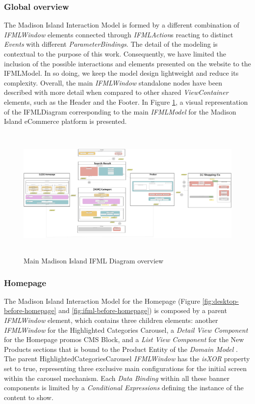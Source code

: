 \subsubsection{Global overview}

The Madison Island Interaction Model is formed by a different combination of \textit{IFMLWindow} elements connected through \textit{IFMLAction}s reacting to distinct \textit{Events} with different \textit{ParameterBindings}. The detail of the modeling is contextual to the purpose of this work. Consequently, we have limited the inclusion of the possible interactions and elements presented on the website to the IFMLModel. In so doing, we keep the model design lightweight and reduce its complexity. Overall, the main \textit{IFMLWindow} standalone nodes have been described with more detail when compared to other shared \textit{ViewContainer} elements, such as the Header and the Footer. In Figure \ref{fig:ifml-before-global}, a visual representation of the IFMLDiagram corresponding to the main \textit{IFMLModel} for the Madison Island eCommerce platform is presented.

\vspace{0.5cm}
\begin{figure}[H]
  \centering
    \includegraphics[height=6.5cm] {images/diagrams/before/ifml-global.png}
  \caption{Main Madison Island IFML Diagram overview}
  \label{fig:ifml-before-global}
\end{figure}
\vspace{0.5cm}
\newpage
\subsubsection{Homepage}

The Madison Island Interaction Model for the Homepage (Figure \ref{fig:desktop-before-homepage} and \ref{fig:ifml-before-homepage}) is composed by a parent \textit{IFMLWindow} element, which contains three children elements: another \textit{IFMLWindow} for the Highlighted Categories Carousel, a \textit{Detail View Component} for the Homepage promos CMS Block, and a \textit{List View Component} for the New Products sections that is bound to the Product Entity of the \textit{Domain Model} . The parent HighlightedCategoriesCarousel \textit{IFMLWindow} has the \textit{isXOR} property set to true, representing three exclusive main configurations for the initial screen within the carousel mechanism. Each \textit{Data Binding} within all these banner components is limited by a \textit{Conditional Expressions} defining the instance of the content to show.

